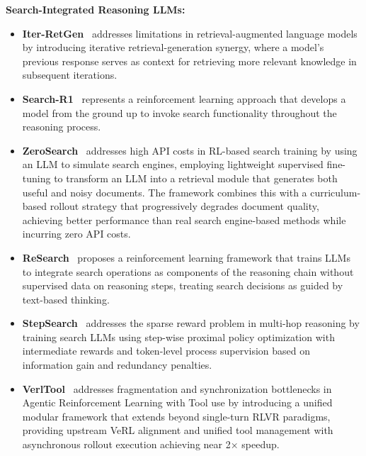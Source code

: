 \textbf{Search-Integrated Reasoning LLMs:}
\begin{itemize}[leftmargin=1em]
\item \textbf{Iter-RetGen}~\citep{shao2023enhancing} addresses limitations in retrieval-augmented language models by introducing iterative retrieval-generation synergy, where a model's previous response serves as context for retrieving more relevant knowledge in subsequent iterations. 


\item \textbf{Search-R1}~\citep{jin2025search} represents a reinforcement learning approach that develops a model from the ground up to invoke search functionality throughout the reasoning process.


\item \textbf{ZeroSearch}~\citep{sun2025zerosearch} addresses high API costs in RL-based search training by using an LLM to simulate search engines, employing lightweight supervised fine-tuning to transform an LLM into a retrieval module that generates both useful and noisy documents. The framework combines this with a curriculum-based rollout strategy that progressively degrades document quality, achieving better performance than real search engine-based methods while incurring zero API costs.


\item \textbf{ReSearch}~\citep{chen2025research} proposes a reinforcement learning framework that trains LLMs to integrate search operations as components of the reasoning chain without supervised data on reasoning steps, treating search decisions as guided by text-based thinking. 

\item \textbf{StepSearch}~\citep{wang2025stepsearch} addresses the sparse reward problem in multi-hop reasoning by training search LLMs using step-wise proximal policy optimization with intermediate rewards and token-level process supervision based on information gain and redundancy penalties. 

\item \textbf{VerlTool}~\citep{jiang2025verltool} addresses fragmentation and synchronization bottlenecks in Agentic Reinforcement Learning with Tool use by introducing a unified modular framework that extends beyond single-turn RLVR paradigms, providing upstream VeRL alignment and unified tool management with asynchronous rollout execution achieving near 2× speedup. 
\end{itemize}

